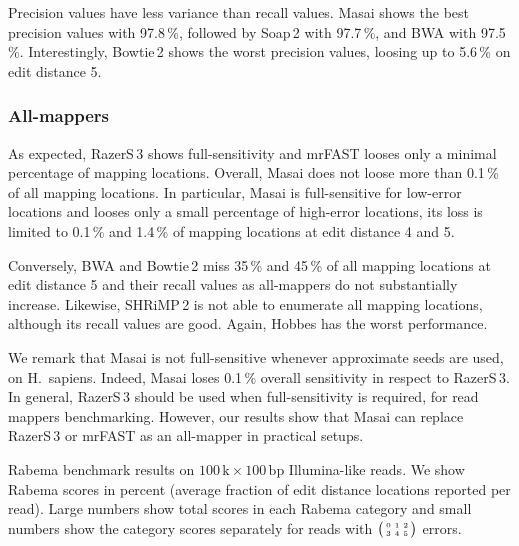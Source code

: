 Precision values have less variance than recall values. Masai shows the best precision values with 97.8\,\%, followed by Soap\,2 with 97.7\,\%, and BWA with 97.5\,\%. Interestingly, Bowtie\,2 shows the worst precision values, loosing up to 5.6\,\% on edit distance 5.

\subsubsection{All-mappers}
As expected, RazerS\,3 shows full-sensitivity and mrFAST looses only a minimal percentage of mapping locations.
Overall, Masai does not loose more than 0.1\,\% of all mapping locations.
In particular, Masai is full-sensitive for low-error locations and looses only a small percentage of high-error locations, \ie its loss is limited to 0.1\,\% and 1.4\,\% of mapping locations at edit distance 4 and 5.

Conversely, BWA and Bowtie\,2 miss 35\,\% and 45\,\% of all mapping locations at edit distance 5 and their recall values as all-mappers do not substantially increase.
Likewise, SHRiMP\,2 is not able to enumerate all mapping locations, although its recall values are good.
Again, Hobbes has the worst performance.

We remark that Masai is not full-sensitive whenever approximate seeds are used, \eg on H.~sapiens. Indeed, Masai loses 0.1\,\% overall sensitivity in respect to RazerS\,3.
In general, RazerS\,3 should be used when full-sensitivity is required, \ie for read mappers benchmarking. However, our results show that Masai can replace RazerS\,3 or mrFAST as an all-mapper in practical setups.

\begin{table*}[t]
  \caption[Rabema benchmark results]
  {
  \label{tab:Rabema}
    Rabema benchmark results on $100\,\text{k}\times 100\,\text{bp}$ Illumina-like reads.
    We show Rabema scores in percent (average fraction of edit distance locations reported per read).
    Large numbers show total scores in each Rabema category and small numbers show the category scores separately for reads with $\bigl(\begin{smallmatrix}\mbox{\tiny 0}&\mbox{\tiny 1}&\mbox{\tiny 2}\\\mbox{\tiny 3}&\mbox{\tiny 4}&\mbox{\tiny 5}\end{smallmatrix}\bigr)$ errors.
    }
  \vspace{-3mm}
  \center
  \sffamily
  \resizebox{0.95\textwidth}{!}
  {
	\renewcommand{\tabcolsep}{0.8ex}
	
  }
\end{table*}

